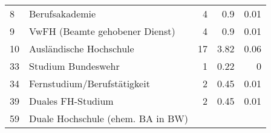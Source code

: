 \begin{longtable}{lXrrr}
     8 &
     \multicolumn{1}{X}{ Berufsakademie   } &


       \num{4} &
       \num[round-mode=places,round-precision=2]{0.9} &
         \num[round-mode=places,round-precision=2]{0.01} \\

     9 &
     \multicolumn{1}{X}{ VwFH (Beamte gehobener Dienst)   } &


       \num{4} &
       \num[round-mode=places,round-precision=2]{0.9} &
         \num[round-mode=places,round-precision=2]{0.01} \\

     10 &
     \multicolumn{1}{X}{ Ausländische Hochschule   } &


       \num{17} &
       \num[round-mode=places,round-precision=2]{3.82} &
         \num[round-mode=places,round-precision=2]{0.06} \\

     33 &
     \multicolumn{1}{X}{ Studium Bundeswehr   } &


       \num{1} &
       \num[round-mode=places,round-precision=2]{0.22} &
         \num[round-mode=places,round-precision=2]{0} \\

     34 &
     \multicolumn{1}{X}{ Fernstudium/Berufstätigkeit   } &


       \num{2} &
       \num[round-mode=places,round-precision=2]{0.45} &
         \num[round-mode=places,round-precision=2]{0.01} \\

     39 &
     \multicolumn{1}{X}{ Duales FH-Studium   } &


       \num{2} &
       \num[round-mode=places,round-precision=2]{0.45} &
         \num[round-mode=places,round-precision=2]{0.01} \\

     59 &
     \multicolumn{1}{X}{ Duale Hochschule (ehem. BA in BW)   } &



\end{longtable}

